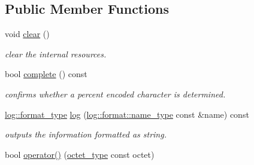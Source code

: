\subsection*{Public Member Functions}
\begin{DoxyCompactItemize}
\item 
\hypertarget{classhryky_1_1uri_1_1pct_1_1_reader_a8f2cd4a391ebd608b85b7a8ee96c72b6}{void \hyperlink{classhryky_1_1uri_1_1pct_1_1_reader_a8f2cd4a391ebd608b85b7a8ee96c72b6}{clear} ()}\label{classhryky_1_1uri_1_1pct_1_1_reader_a8f2cd4a391ebd608b85b7a8ee96c72b6}

\begin{DoxyCompactList}\small\item\em clear the internal resources. \end{DoxyCompactList}\item 
\hypertarget{classhryky_1_1uri_1_1pct_1_1_reader_a29a936a7cbc6b06bc81a27dc61b4c65a}{bool \hyperlink{classhryky_1_1uri_1_1pct_1_1_reader_a29a936a7cbc6b06bc81a27dc61b4c65a}{complete} () const }\label{classhryky_1_1uri_1_1pct_1_1_reader_a29a936a7cbc6b06bc81a27dc61b4c65a}

\begin{DoxyCompactList}\small\item\em confirms whether a percent encoded character is determined. \end{DoxyCompactList}\item 
\hypertarget{classhryky_1_1uri_1_1pct_1_1_reader_afa4a4c74c0a845a31732552fbc50d9e1}{\hyperlink{namespacehryky_1_1log_ad50448c3f934f1eacd5c1bcffe8111e1}{log\-::format\-\_\-type} \hyperlink{classhryky_1_1uri_1_1pct_1_1_reader_afa4a4c74c0a845a31732552fbc50d9e1}{log} (\hyperlink{namespacehryky_1_1log_1_1format_ab7408d1e2ed2d648dbf9bba69eb74288}{log\-::format\-::name\-\_\-type} const \&name) const }\label{classhryky_1_1uri_1_1pct_1_1_reader_afa4a4c74c0a845a31732552fbc50d9e1}

\begin{DoxyCompactList}\small\item\em outputs the information formatted as string. \end{DoxyCompactList}\item 
\hypertarget{classhryky_1_1uri_1_1pct_1_1_reader_a011c53ac97485bff55fa219c58605f52}{bool \hyperlink{classhryky_1_1uri_1_1pct_1_1_reader_a011c53ac97485bff55fa219c58605f52}{operator()} (\hyperlink{namespacehryky_a488cba8b666be33ccca70e819684e3c8}{octet\-\_\-type} const octet)}\label{classhryky_1_1uri_1_1pct_1_1_reader_a011c53ac97485bff55fa219c58605f52}


\end{DoxyCompactItemize}
